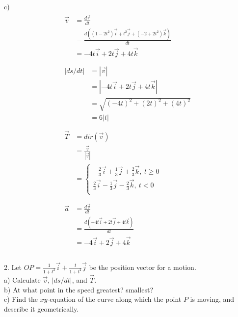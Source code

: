 \documentclass{article}
\begin{document}
c) 
\begin{gather*}
  \begin{split}
    \vec{v} &= \frac{d\vec{r}}{dt} \\
            &= \frac{d((1 - 2t^2) \vec{i} + t^2 \vec{j} + (-2 + 2t^2) \vec{k})}{dt} \\
            &= -4t \vec{i} + 2t \vec{j} + 4t \vec{k} \\
  \end{split} \\
  \begin{split}
    |ds/dt| &= |\vec{v}| \\
            &= |-4t \vec{i} + 2t \vec{j} + 4t \vec{k}| \\
            &= \sqrt{(-4t)^2 + (2t)^2 + (4t)^2} \\
            &= 6|t| \\
  \end{split} \\
  \begin{split}
    \vec{T} &= dir(\vec{v}) \\
            &= \frac{\vec{v}}{|\vec{v}|} \\
            &= \begin{cases}
                 -\frac{2}{3} \vec{i} + \frac{1}{3} \vec{j} + \frac{2}{3} \vec{k} ,\ t \geq 0 \\
                 \frac{2}{3} \vec{i} - \frac{1}{3} \vec{j} - \frac{2}{3} \vec{k} ,\ t < 0 \\
               \end{cases} \\
  \end{split} \\
  \begin{split}
    \vec{a} &= \frac{d\vec{v}}{dt} \\
            &= \frac{d(-4t \vec{i} + 2t \vec{j} + 4t \vec{k})}{dt} \\
            &= -4 \vec{i} + 2 \vec{j} + 4 \vec{k} \\
  \end{split} \\
\end{gather*}

\bigskip

2. Let $OP = \frac{1}{1 + t^2} \vec{i} + \frac{t}{1 + t^2} \vec{j}$ be the 
position vector for a motion. \\
a) Calculate $\vec{v}$, $|ds/dt|$, and $\vec{T}$. \\
b) At what point in the speed greatest? smallest? \\
c) Find the $xy$-equation of the curve along which the point $P$ is moving, and 
describe it geometrically.
\end{document}
